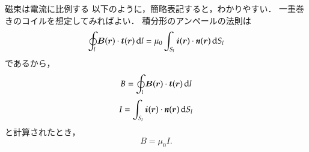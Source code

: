         \begin{memo}{磁束は電流に比例する}
            以下のように，簡略表記すると，わかりやすい．
            一重巻きのコイルを想定してみればよい．
            積分形のアンペールの法則は
            \begin{equation*}
                \oint_{l} \boldsymbol{B}(\boldsymbol{r})\cdot\boldsymbol{t}(\boldsymbol{r})\,\mathrm{d} l
                =\mu_{0}\int_{S_{l}} \boldsymbol{i}(\boldsymbol{r})
                \cdot\textit{\textbf{n}}(\boldsymbol{r})\,\mathrm{d} S_{l}
            \end{equation*}
            であるから，
            \begin{equation*}
                B = \oint_{l} \boldsymbol{B}(\boldsymbol{r})\cdot\boldsymbol{t}(\boldsymbol{r})\,\mathrm{d} l
            \end{equation*}
            \begin{equation*}
                I = \int_{S_{l}} \boldsymbol{i}(\boldsymbol{r})\cdot\textit{\textbf{n}}(\boldsymbol{r})\,\mathrm{d} S_{l}
            \end{equation*}
            と計算されたとき，
            \begin{equation*}
                B=\mu_{0}I.
            \end{equation*}
        \end{memo}


